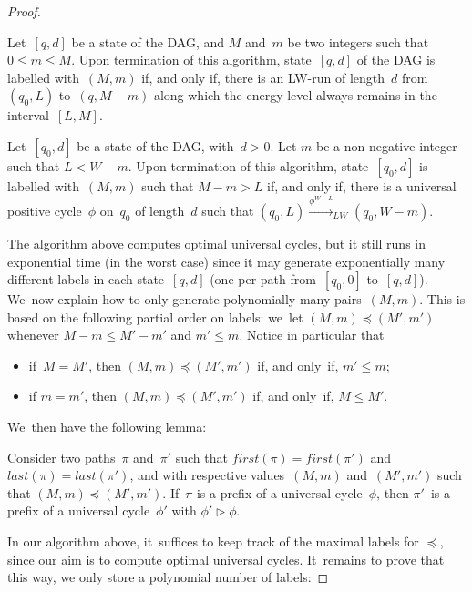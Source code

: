 \begin{proof}
    \begin{lemma}
    \label{lemma-DAGlabel}
    Let~$[q,d]$ be a state of the DAG, and $M$ and~$m$ be two integers
    such that $0\leq m\leq M$.  Upon termination of this algorithm,
    state~$[q,d]$ of the DAG is labelled with~$(M,m)$ if, and only if, there is an LW-run of length~$d$ from~$(q_0,L)$ to~$(q,M-m)$ along which the energy level always remains in the interval~$[L,M]$.
    \end{lemma}
    
    \begin{lemma}
    \label{lemma-univcycle}
    Let~$[q_0,d]$ be a state of the DAG, with~$d>0$. Let $m$ be a
    non-negative integer such that $L<W-m$.  Upon termination of this algorithm, state~$[q_0,d]$ is labelled with~$(M,m)$ such that $M-m>L$ if, and only if, there is a universal positive cycle~$\phi$ on~$q_0$ of length~$d$ such that $(q_0,L) \xrightarrow{\phi^{W-L}}_{LW} (q_0,W-m)$.
    \end{lemma}
    
    
    The algorithm above computes optimal universal cycles, but it still runs in exponential time (in the worst case) since it may generate exponentially many different labels in each state~$[q,d]$ (one per path from~$[q_0,0]$ to~$[q,d]$). We~now explain how to only generate polynomially-many pairs~$(M,m)$. This is based on the following partial order on labels: we~let $(M,m) \preceq (M',m')$ whenever $M-m\leq M'-m'$ and $m'\leq m$. Notice in particular that
    \begin{itemize}
    \item if~$M=M'$, then $(M,m)\preceq (M',m')$ if, and only~if, $m'\leq m$;
    \item if $m=m'$, then $(M,m)\preceq (M',m')$ if, and only~if, $M\leq M'$.
    \end{itemize}
    We~then have the following lemma:
    
    \vskip 0.5cm
    \begin{lemma}
    \label{lemma-order-cycle}
    Consider two paths~$\pi$ and~$\pi'$ such that
    $first(\pi)=first(\pi')$ and $last(\pi)=last(\pi')$, and with
    respective values~$(M,m)$ and~$(M',m')$ such that $(M,m)\preceq (M',m')$.
    If~$\pi$ is a prefix of a universal cycle~$\phi$, then $\pi'$~is a
    prefix of a universal cycle~$\phi'$ with $\phi'\triangleright \phi$.
    \end{lemma}
    
    
    In our algorithm above, it~suffices to keep track of the maximal labels for $\preceq$, since our aim is to compute optimal universal cycles. It~remains to prove that this way, we only store a polynomial number of labels:
    

\end{proof}
